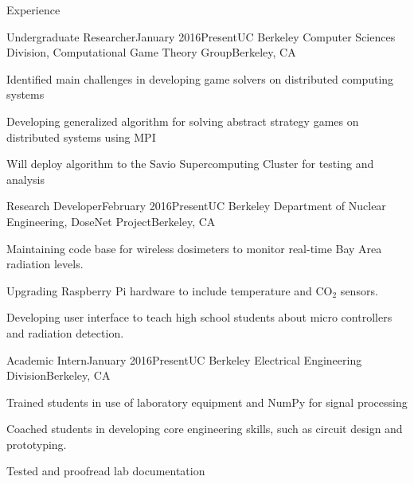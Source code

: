 \documentclass{resume} %
\begin{document}
\begin{rSection}{Experience}
\begin{rSubsection}{Undergraduate Researcher}{January 2016\textminus Present}{UC Berkeley Computer Sciences Division, Computational Game Theory Group}{Berkeley, CA}
\item[] Identified main challenges in developing game solvers on distributed computing systems
\item[] Developing generalized algorithm for solving abstract strategy games on distributed systems using MPI
\item[] Will deploy algorithm to the Savio Supercomputing Cluster for testing and analysis
\end{rSubsection}
\begin{rSubsection}{Research Developer}{February 2016\textminus Present}{UC Berkeley Department of Nuclear Engineering, DoseNet Project}{Berkeley, CA}
\item[] Maintaining code base for wireless dosimeters to monitor real-time Bay Area radiation levels.
\item[] Upgrading Raspberry Pi hardware to include temperature and CO$_2$ sensors. 
\item[] Developing user interface to teach high school students about micro controllers and radiation detection.
\end{rSubsection}
\begin{rSubsection}{Academic Intern}{January 2016\textminus Present}{UC Berkeley Electrical Engineering Division}{Berkeley, CA}
\item[] Trained students in use of laboratory equipment and NumPy for signal processing
\item[] Coached students in developing core engineering skills, such as circuit design and prototyping.
\item[] Tested and proofread lab documentation
\end{rSubsection}
\end{rSection}

\end{document}
